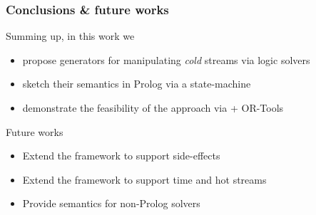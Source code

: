 \documentclass[presentation]{beamer}
\begin{document}
\begin{frame}%
\frametitle{Conclusions \& future works}

\begin{block}{Summing up, in this work we}
    \begin{itemize}
        \item propose \alert{generators} for manipulating \emph{cold} streams via logic solvers
        \item sketch their semantics in Prolog via a \alert{state-machine}
        \item demonstrate the feasibility of the approach via \alert{\twopkt{} + OR-Tools}
    \end{itemize}
\end{block}

\begin{exampleblock}{Future works}
    \begin{itemize}
        \item Extend the framework to support \alert{side-effects}
        \item Extend the framework to support \alert{time} and \alert{hot streams}
        \item Provide semantics for \alert{non-Prolog} solvers
    \end{itemize}
\end{exampleblock}

\end{frame}

\section*{}
\frame{\titlepage}
\end{document}
